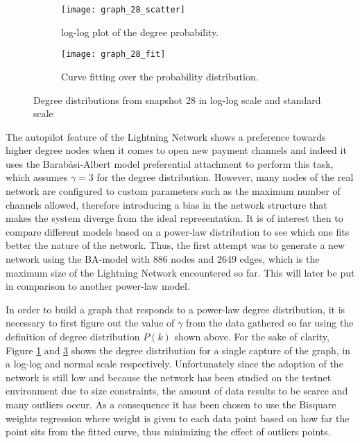 	\begin{figure}
	\centering
	\begin{subfigure}{\textwidth}
		\centering
		\texttt{[image: graph\_28\_scatter]}
		\caption{log-log plot of the degree probability.}
		\label{graph_28_scatter}
	\end{subfigure}
	\begin{subfigure}{\textwidth}
		\centering
		\texttt{[image: graph\_28\_fit]}
		\caption{Curve fitting over the probability distribution.}
		\label{graph_28_degree}
	\end{subfigure}
		\caption{Degree distributions from snapshot 28 in log-log scale and standard scale}
	\end{figure}
	
	The autopilot feature of the Lightning Network shows a preference towards higher degree nodes when it comes to open new payment channels and indeed it uses the Barabàsi-Albert model preferential attachment to perform this task, which assumes $\gamma=3$ for the degree distribution. However, many nodes of the real network are configured to custom parameters such as the maximum number of channels allowed, therefore introducing a bias in the network structure that makes the system diverge from the ideal representation. It is of interest then to compare different models based on a power-law distribution to see which one fits better the nature of the network. Thus, the first attempt was to generate a new network using the BA-model with 886 nodes and 2649 edges, which is the maximum size of the Lightning Network encountered so far. This will later be put in comparison to another power-law model.
	
	In order to build a graph that responds to a power-law degree distribution, it is necessary to first figure out the value of $\gamma$ from the data gathered so far using the definition of degree distribution $P(k)$ shown above. For the sake of clarity, Figure \ref{graph_28_scatter} and \ref{graph_28_degree} shows the degree distribution for a single capture of the graph, in a log-log and normal scale respectively. Unfortunately since the adoption of the network is still low and because the network has been studied on the testnet environment due to size constraints, the amount of data results to be scarce and many outliers occur. As a consequence it has been chosen to use the Bisquare weights regression where weight is given to each data point based on how far the point sits from the fitted curve, thus minimizing the effect of outliers points.
	
